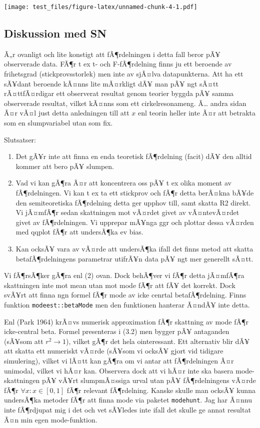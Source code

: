 \documentclass[]{article}
\providecommand{\tightlist}{%
  \setlength{\itemsep}{0pt}\setlength{\parskip}{0pt}}
\begin{document}
\texttt{[image: test\_files/figure-latex/unnamed-chunk-4-1.pdf]}

\subsection{Diskussion med SN}\label{diskussion-med-sn}

Ã„r ovanligt och lite konstigt att fÃ¶rdelningen i detta fall beror pÃ¥
observerade data. FÃ¶r t ex t- och F-fÃ¶rdelning finns ju ett beroende
av frihetsgrad (stickprovsstorlek) men inte av sjÃ¤lva datapunkterna.
Att ha ett sÃ¥dant beroende kÃ¤nns lite mÃ¤rkligt dÃ¥ man pÃ¥ ngt sÃ¤tt
rÃ¤ttfÃ¤rdigar ett observerat resultat genom teorier byggda pÃ¥ samma
observerade resultat, vilket kÃ¤nns som ett cirkelresonameng. Ã\ldots{}
andra sidan Ã¤r vÃ¤l just detta anledningen till att \(x\) enl teorin
heller inte Ã¤r att betrakta som en slumpvariabel utan som fix.

Slutsatser:

\begin{enumerate}
\def\labelenumi{\arabic{enumi}.}
\tightlist
\item
  Det gÃ¥r inte att finna en enda teoretisk fÃ¶rdelning (facit) dÃ¥ den
  alltid kommer att bero pÃ¥ slumpen.
\item
  Vad vi kan gÃ¶ra Ã¤r att koncentrera oss pÃ¥ t ex olika moment av
  fÃ¶rdelningen. Vi kan t ex ta ett stickprov och fÃ¶r detta berÃ¤kna
  bÃ¥de den semiteoretiska fÃ¶rdelning detta ger upphov till, samt
  skatta R2 direkt. Vi jÃ¤mfÃ¶r sedan skattningen mot vÃ¤rdet givet av
  vÃ¤ntevÃ¤rdet givet av fÃ¶rdelningen. Vi upprepar mÃ¥nga ggr och
  plottar dessa vÃ¤rden med qqplot fÃ¶r att undersÃ¶ka ev bias.
\item
  Kan ocksÃ¥ vara av vÃ¤rde att undersÃ¶ka ifall det finns metod att
  skatta betafÃ¶rdelningens parametrar utifrÃ¥n data pÃ¥ ngt mer
  generellt sÃ¤tt.
\end{enumerate}

Vi fÃ¶rsÃ¶ker gÃ¶ra enl (2) ovan. Dock behÃ¶ver vi fÃ¶r detta jÃ¤mfÃ¶ra
skattningen inte mot mean utan mot mode fÃ¶r att fÃ¥ det korrekt. Dock
svÃ¥rt att finna ngn formel fÃ¶r mode av icke cenrtal betafÃ¶rdelning.
Finns funktion \texttt{modeest::betaMode} men den funktionen hanterar
Ã¤ndÃ¥ inte detta.

Enl (Park 1964) krÃ¤vs numerisk approximation fÃ¶r skattning av mode
fÃ¶r icke-central beta. Formel presenteras i (3.2) men bygger pÃ¥
antaganden (sÃ¥som att \(r^2 \rightarrow 1\)), vilket gÃ¶r det hela
ointeressant. Ett alternativ blir dÃ¥ att skatta ett numeriskt vÃ¤rde
(sÃ¥som vi ocksÃ¥ gjort vid tidigare simulering), vilket vi lÃ¤tt kan
gÃ¶ra om vi antar att fÃ¶rdelningen Ã¤r unimodal, vilket vi hÃ¤r kan.
Observera dock att vi hÃ¤r inte ska basera mode-skattningen pÃ¥ vÃ¥rt
slumpmÃ¤ssiga urval utan pÃ¥ fÃ¶rdelningens vÃ¤rde fÃ¶r
\(\forall x: x \in [0,1]\) fÃ¶r relevant fÃ¶rdelning. Kanske skulle man
ocksÃ¥ kunna undersÃ¶ka metoder fÃ¶r att finna mode via paketet
\texttt{modehunt}. Jag har Ã¤nnu inte fÃ¶rdjupat mig i det och vet
sÃ¥ledes inte ifall det skulle ge annat resultat Ã¤n min egen
mode-funktion.
\end{document}
